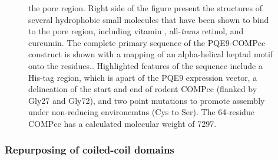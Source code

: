 \begin{refsection}
\begin{figure}[h!]
{the pore region.  Right side of the figure present the structures of several
hydrophobic small molecules that have been shown to bind to the pore region,
including vitamin , all-\emph{trans} retinol, and
curcumin.\cite{Gunasekar2009} The complete primary sequence of the PQE9-COMPcc
construct is shown with a mapping of an alpha-helical heptad motif onto the
residues.\cite{Efimov1994}. Highlighted features of the sequence include a His-tag
region, which is apart of the PQE9 expression vector, a delineation of the start
and end of rodent COMPcc (flanked by Gly27 and Gly72), and two point mutations
to promote assembly under non-reducing environemtns (Cys to Ser). The 64-residue
COMPcc has a calculated molecular weight of \SI{7297}{\Da}.}

    \label{fig:our_COMP} \end{figure}
\subsubsection{Repurposing of coiled-coil domains}


\end{refsection}
